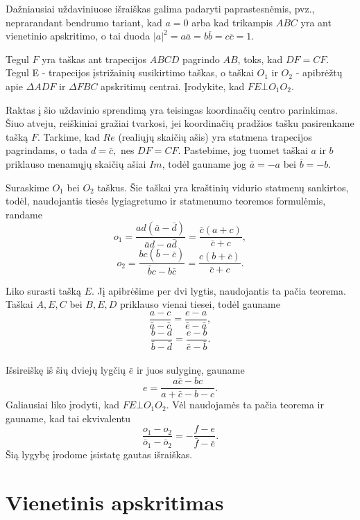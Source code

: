 \documentclass[11pt,a4paper,twoside]{book}
\begin{document}
Dažniausiai uždaviniuose išraiškas galima padaryti paprastesnėmis, pvz., neprarandant bendrumo tariant, kad $a=0$ arba kad trikampis $ABC$ yra ant vienetinio apskritimo, o tai duoda $|a|^2=a\overline{a}=b\overline{b}=c\overline{c}=1$.

\begin{pavnr}
Tegul $F$ yra taškas ant trapecijos $ABCD$ pagrindo $AB$, toks, kad $DF=CF$. Tegul E - trapecijos įstrižainių susikirtimo taškas, o taškai $O_1$ ir $O_2$ - apibrėžtų apie $ \Delta ADF$ ir $\Delta FBC$ apskritimų centrai. Įrodykite, kad $ FE \bot O_1 O_2 $.
\end{pavnr}
\begin{sprendimas}
Raktas į šio uždavinio sprendimą yra teisingas koordinačių centro parinkimas. 
Šiuo atveju, reiškiniai gražiai tvarkosi, jei koordinačių pradžios tašku pasirenkame tašką $F$. Tarkime, kad $Re$ (realiųjų skaičių ašis) yra statmena trapecijos pagrindams, o tada $d = \bar c ,$ nes $DF=CF$. Pastebime, jog tuomet taškai $a$ ir $b$ priklauso menamųjų skaičių ašiai $Im$, todėl gauname jog $ \bar a = - a $ bei $ \bar b = - b$.

Suraskime $O_1$ bei $O_2$ taškus. Šie taškai yra kraštinių vidurio statmenų sankirtos, todėl, naudojantis tiesės lygiagretumo ir statmenumo teoremos formulėmis, randame
$$ o_1 = \frac { ad( \bar a - \bar d) } { \bar a d - a \bar d } = \frac {\bar c ( a + c) } { \bar c + c },$$  
$$  o_2 = \frac { bc( \bar b - \bar c) } { \bar b c - b \bar c } = \frac { c( b + \bar c) } { \bar c + c }.$$

Liko surasti tašką $E$. Jį apibrėšime per dvi lygtis, naudojantis ta pačia teorema. Taškai $A, E, C$ bei $B, E, D$ priklauso vienai tiesei, todėl gauname
$$ \frac { a- c} {\bar a-\bar c} = \frac {e-a}{ \bar e - \bar a},$$
$$ \frac { b-d} {\bar b-\bar d} = \frac {e-b}{ \bar e - \bar b}.$$
\\ Išsireiškę iš šių dviejų lygčių  $ \bar e$ ir juos sulyginę, gauname
\\ $$ e = \frac { a \bar c - bc}{ a+ \bar c -b-c}.$$
Galiausiai liko įrodyti, kad $FE \bot O_1 O_2 $. Vėl naudojamės ta pačia teorema ir gauname, kad tai ekvivalentu
 $$  \frac {o_1 - o_2} { \bar o_1 - \bar o_2}= - \frac { f-e}{\bar f - \bar e}.$$
Šią lygybę įrodome įsistatę gautas išraiškas.
\end{sprendimas}


\section{Vienetinis apskritimas}
\end{document}
